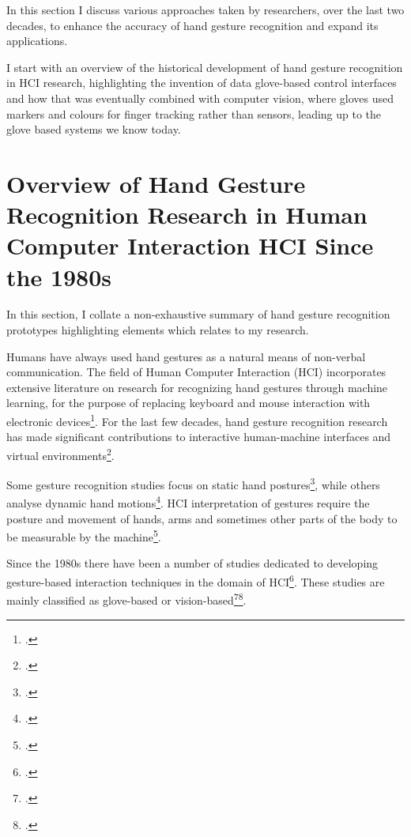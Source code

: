 In this section I discuss various approaches taken by researchers, over the last two decades, to enhance the accuracy of hand gesture recognition and expand its applications.

I start with an overview of the historical development of hand gesture recognition in HCI research, highlighting the invention of data glove-based control interfaces and how that was eventually combined with computer vision, where gloves used markers and colours for finger tracking rather than sensors, leading up to the glove based systems we know today. 

\section{Overview of Hand Gesture Recognition Research in Human Computer Interaction HCI Since the 1980s}

In this section, I collate a non-exhaustive summary of hand gesture recognition prototypes highlighting elements which relates to my research. 

Humans have always used hand gestures as a natural means of non-verbal communication. The field of Human Computer Interaction (HCI) incorporates extensive literature on research for recognizing hand gestures through machine learning, for the purpose of replacing keyboard and mouse interaction with electronic devices\footcite{Takahashi1992}. For the last few decades, hand gesture recognition research has made significant contributions to interactive human-machine interfaces and virtual environments\footcite{Takahashi1992}. 

Some gesture recognition studies focus on static hand postures\footcite{Klboz2015}, while others analyse dynamic hand motions\footcite{Rigoll1997}. HCI interpretation of gestures require the posture and movement of hands, arms and sometimes other parts of the body to be measurable by the machine\footcite{Pavlovic1997}.

Since the 1980s there have been a number of studies dedicated to developing gesture-based interaction techniques in the domain of HCI\footcite{Rautaray2015}. These studies are mainly classified as glove-based or vision-based\footcite{Rautaray2015}\footcite{Pavlovic1997}.

